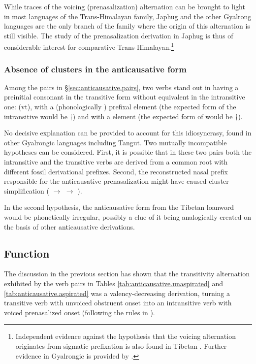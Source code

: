 While traces of the voicing (prenasalization) alternation can be brought to light in most languages of the Trans-Himalayan family, Japhug and the other Gyalrong languages are the only branch of the family where the origin of this alternation is still visible. The study of the prenasalization derivation in Japhug is thus of considerable interest for comparative Trans-Himalayan.\footnote{Independent evidence against the hypothesis that the voicing alternation originates from sigmatic prefixation is also found in Tibetan \citep{jacques20alternation}. Further evidence in Gyalrongic is provided by \citet{gates22voicing}. }


\subsubsection{Absence of clusters in the anticausative form} \label{sec:anticausative.fx}
Among the pairs in §\ref{sec:anticausative.pairs}, two verbs stand out in having a preinitial consonant in the transitive form without equivalent in the intransitive one:  (vt), with a  (phonologically ) prefixal element (the expected form of the intransitive  would be $\dagger$) and  with a  element (the expected form of  would be $\dagger$). 

No decisive explanation can be provided to account for this idiosyncrasy, found in other Gyalrongic languages including Tangut. Two mutually incompatible hypotheses can be considered. First, it is possible that in these two pairs both the intransitive and the transitive verbs are derived from a common root with different fossil derivational prefixes. Second, the reconstructed nasal prefix responsible for the anticausative prenasalization might have caused cluster simplification ( $\rightarrow$  $\rightarrow$ ).

In the second hypothesis, the anticausative form  from the Tibetan loanword  would be phonetically irregular, possibly a clue of it being analogically created on the basis of other anticausative derivations.

\subsection{Function} \label{sec:anticausative.function}
The discussion in the previous section has shown that the transitivity alternation exhibited by the verb pairs in Tables \ref{tab:anticausative.unaspirated} and \ref{tab:anticausative.aspirated} was a valency-decreasing derivation, turning a transitive verb with unvoiced obstruent onset into an intransitive verb with voiced prenasalized onset (following the rules in ).

